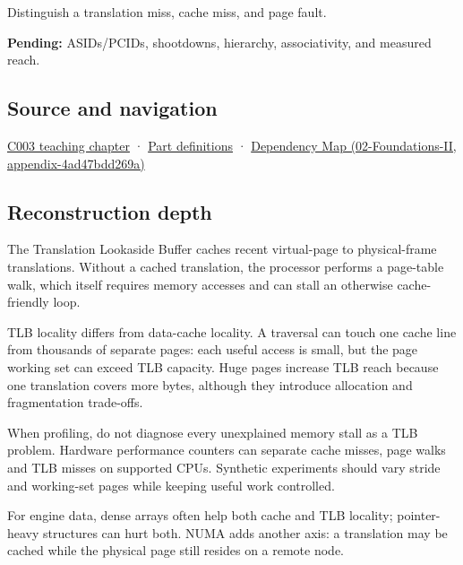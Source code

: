 Distinguish a translation miss, cache miss, and page fault.

\textbf{Pending:} ASIDs/PCIDs, shootdowns, hierarchy, associativity, and measured reach.

\subsection{Source and navigation}\label{source-and-navigation}

\href{Continuous\%20Notes/Computing\%20Foundations\%20-\%20From\%20Bits\%20to\%20C++\%20and\%20Systems\%20APIs\#Where\%20the\%20bytes\%20live}{C003 teaching chapter} · \hyperref[appendix-fd090d982a15]{Part definitions} · \href{}{Dependency Map (02-Foundations-II, appendix-4ad47bdd269a)}

\subsection{Reconstruction depth}\label{reconstruction-depth}

The Translation Lookaside Buffer caches recent virtual-page to physical-frame translations. Without a cached translation, the processor performs a page-table walk, which itself requires memory accesses and can stall an otherwise cache-friendly loop.

TLB locality differs from data-cache locality. A traversal can touch one cache line from thousands of separate pages: each useful access is small, but the page working set can exceed TLB capacity. Huge pages increase TLB reach because one translation covers more bytes, although they introduce allocation and fragmentation trade-offs.

When profiling, do not diagnose every unexplained memory stall as a TLB problem. Hardware performance counters can separate cache misses, page walks and TLB misses on supported CPUs. Synthetic experiments should vary stride and working-set pages while keeping useful work controlled.

For engine data, dense arrays often help both cache and TLB locality; pointer-heavy structures can hurt both. NUMA adds another axis: a translation may be cached while the physical page still resides on a remote node.
